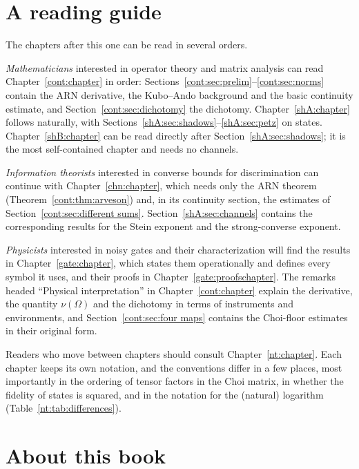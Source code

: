 \section{A reading guide}\label{ov:sec:reading}

The chapters after this one can be read in several orders.

\emph{Mathematicians} interested in operator theory and matrix analysis can read Chapter~\ref{cont:chapter} in order: Sections~\ref{cont:sec:prelim}--\ref{cont:sec:norms} contain the ARN derivative, the Kubo--Ando background and the basic continuity estimate, and Section~\ref{cont:sec:dichotomy} the dichotomy. Chapter~\ref{shA:chapter} follows naturally, with Sections~\ref{shA:sec:shadows}--\ref{shA:sec:petz} on states. Chapter~\ref{shB:chapter} can be read directly after Section~\ref{shA:sec:shadows}; it is the most self-contained chapter and needs no channels.

\emph{Information theorists} interested in converse bounds for discrimination can continue with Chapter~\ref{chn:chapter}, which needs only the ARN theorem (Theorem~\ref{cont:thm:arveson}) and, in its continuity section, the estimates of Section~\ref{cont:sec:different sums}. Section~\ref{shA:sec:channels} contains the corresponding results for the Stein exponent and the strong-converse exponent.

\emph{Physicists} interested in noisy gates and their characterization will find the results in Chapter~\ref{gate:chapter}, which states them operationally and defines every symbol it uses, and their proofs in Chapter~\ref{gate:proofschapter}. The remarks headed ``Physical interpretation'' in Chapter~\ref{cont:chapter} explain the derivative, the quantity $\nu(\Omega)$ and the dichotomy in terms of instruments and environments, and Section~\ref{cont:sec:four maps} contains the Choi-floor estimates in their original form.

Readers who move between chapters should consult Chapter~\ref{nt:chapter}. Each chapter keeps its own notation, and the conventions differ in a few places, most importantly in the ordering of tensor factors in the Choi matrix, in whether the fidelity of states is squared, and in the notation for the (natural) logarithm (Table~\ref{nt:tab:differences}).

\section{About this book}\label{ov:sec:edition}

